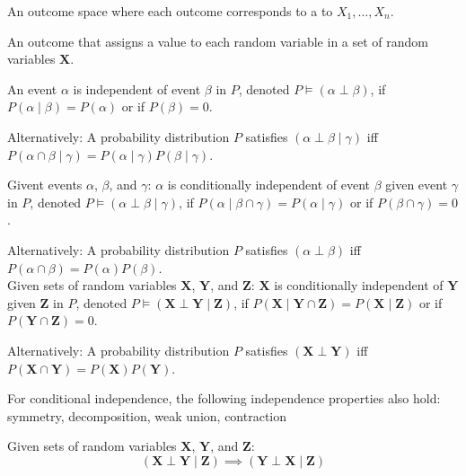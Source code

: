 {%
  An \gls{outcome space} where each outcome corresponds to a  to $X_1,\dots, X_n$.
}

{%
  An outcome that assigns a value to each \gls{random variable} in a set of random variables $\bm{X}$.
}

{%
  An event $\alpha$ is independent of event $\beta$ in $P$, denoted $P\models(\alpha\perp\beta)$, if $P(\alpha\mid\beta)=P(\alpha)$ or if $P(\beta)=0$.

  Alternatively: A \gls{probability distribution} $P$ satisfies $(\alpha\perp\beta\mid\gamma)$ \acrshort{iff} $P(\alpha\cap\beta\mid\gamma)=P(\alpha\mid\gamma)P(\beta\mid\gamma)$.
}

{%
  Givent events $\alpha$, $\beta$, and $\gamma$: $\alpha$ is conditionally independent of event $\beta$ given event $\gamma$ in $P$, denoted $P\models(\alpha\perp\beta\mid\gamma)$, if $P(\alpha\mid\beta\cap\gamma)=P(\alpha\mid\gamma)$ or if $P(\beta\cap\gamma)=0$.

  Alternatively: A \gls{probability distribution} $P$ satisfies $(\alpha\perp\beta)$ \acrshort{iff} $P(\alpha\cap\beta)=P(\alpha)P(\beta)$.\\[0.1cm]

  Given sets of random variables $\bm{X}$, $\bm{Y}$, and $\bm{Z}$: $\bm{X}$ is conditionally independent of $\bm{Y}$ given $\bm{Z}$ in $P$, denoted $P\models(\bm{X}\perp\bm{Y}\mid\bm{Z})$, if $P(\bm{X}\mid\bm{Y}\cap\bm{Z})=P(\bm{X}\mid\bm{Z})$ or if $P(\bm{Y}\cap\bm{Z})=0$.

  Alternatively: A \gls{probability distribution} $P$ satisfies $(\bm{X}\perp\bm{Y})$ \acrshort{iff} $P(\bm{X}\cap\bm{Y})=P(\bm{X})P(\bm{Y})$.

  For conditional independence, the following independence properties also hold: \gls{symmetry}, \gls{decomposition}, \gls{weak union}, \gls{contraction}
}

{%
  Given sets of random variables $\bm{X}$, $\bm{Y}$, and $\bm{Z}$:
  \begin{equation*}
    (\bm{X}\perp\bm{Y}\mid\bm{Z})\implies(\bm{Y}\perp\bm{X}\mid\bm{Z})
  \end{equation*}
}


